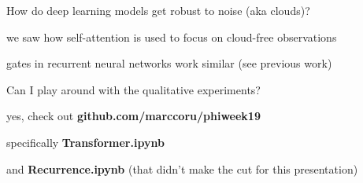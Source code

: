 \documentclass[%
  aspectratio=169,
  9pt,
  english,
  light,
  mathserif,
  professionalfont,
  affiliationintitlepagehead,
  titlegraphic,
   affiliation,
]{beamer}
\begin{document}
{\begin{frame}
	\begin{leftbubbles}
		How do deep learning models get robust to noise (aka clouds)?
	\end{leftbubbles}
	
	\pause
	\begin{rightbubbles}
		we saw how self-attention is used to focus on cloud-free observations
	\end{rightbubbles}
	
	\begin{rightbubbles}
		gates in recurrent neural networks work similar {\small (see previous work)}
	\end{rightbubbles}
	

\end{frame}

\begin{frame}
\Large

\begin{leftbubbles}
	Can I play around with the qualitative experiments?
\end{leftbubbles}

\pause
\begin{rightbubbles}
	yes, check out \textbf{github.com/marccoru/phiweek19}
\end{rightbubbles}

\pause
\begin{rightbubbles}
	specifically \textbf{Transformer.ipynb}
\end{rightbubbles}

\pause
\begin{rightbubbles}
	and \textbf{Recurrence.ipynb} {\small (that didn't make the cut for this presentation)}
\end{rightbubbles}


\end{frame}


}	
%
%
%
%
%
%	
%
\end{document}
